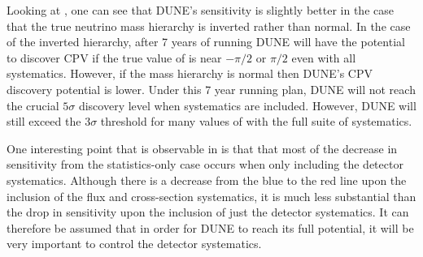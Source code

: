 Looking at , one can see that DUNE's sensitivity is slightly better in the case that the true neutrino mass hierarchy is inverted rather than normal.
In the case of the inverted hierarchy, after 7 years of running DUNE will have the potential to discover CPV if the true value of \dcp is near $-\pi/2$ or $\pi/2$ even with all systematics.
However, if the mass hierarchy is normal then DUNE's CPV discovery potential is lower. 
Under this 7 year running plan, DUNE will not reach the crucial $5\sigma$ discovery level when systematics are included. 
However, DUNE will still exceed the $3\sigma$ threshold for many values of \dcp with the full suite of systematics.

One interesting point that is observable in  is that that most of the decrease in sensitivity from the statistics-only case occurs when only including the detector systematics.
Although there is a decrease from the blue to the red line upon the inclusion of the flux and cross-section systematics, it is much less substantial than the drop in sensitivity upon the inclusion of just the detector systematics.
It can therefore be assumed that in order for DUNE to reach its full potential, it will be very important to control the detector systematics.
